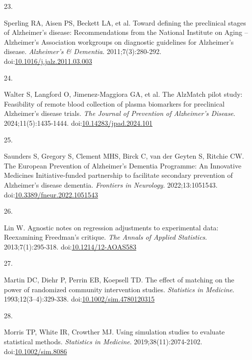 \documentclass[
  11pt,
]{article}
\newlength{\cslhangindent}
\newlength{\csllabelwidth}
\newenvironment{CSLReferences}[2] %
 {\begin{list}{}{%
  \setlength{\itemindent}{0pt}
  \setlength{\leftmargin}{0pt}
  \setlength{\parsep}{0pt}
  \ifodd #1
   \setlength{\leftmargin}{\cslhangindent}
   \setlength{\itemindent}{-1\cslhangindent}
  \fi
  \setlength{\itemsep}{#2\baselineskip}}}
 {\end{list}}
\newcommand{\CSLLeftMargin}[1]{\parbox[t]{\csllabelwidth}{\strut#1\strut}}
\newcommand{\CSLRightInline}[1]{\parbox[t]{\linewidth - \csllabelwidth}{\strut#1\strut}}
\begin{document}
\begin{CSLReferences}{0}{1}
\CSLLeftMargin{23. }%
\CSLRightInline{Sperling RA, Aisen PS, Beckett LA, et al. Toward defining the preclinical stages of {Alzheimer}'s disease: Recommendations from the {National Institute} on {Aging} -- {Alzheimer}'s {Association} workgroups on diagnostic guidelines for {Alzheimer}'s disease. \emph{Alzheimer's \& Dementia}. 2011;7(3):280-292. doi:\href{https://doi.org/10.1016/j.jalz.2011.03.003}{10.1016/j.jalz.2011.03.003}}

\CSLLeftMargin{24. }%
\CSLRightInline{{Walter S, Langford O, Jimenez-Maggiora GA, et al.} The {AlzMatch} pilot study: Feasibility of remote blood collection of plasma biomarkers for preclinical {Alzheimer}'s disease trials. \emph{The Journal of Prevention of Alzheimer's Disease}. 2024;11(5):1435-1444. doi:\href{https://doi.org/10.14283/jpad.2024.101}{10.14283/jpad.2024.101}}

\CSLLeftMargin{25. }%
\CSLRightInline{{Saunders S, Gregory S, Clement MHS, Birck C, van der Geyten S, Ritchie CW}. The {European Prevention} of {Alzheimer}'s {Dementia Programme}: {An Innovative Medicines Initiative-funded} partnership to facilitate secondary prevention of {Alzheimer}'s disease dementia. \emph{Frontiers in Neurology}. 2022;13:1051543. doi:\href{https://doi.org/10.3389/fneur.2022.1051543}{10.3389/fneur.2022.1051543}}

\CSLLeftMargin{26. }%
\CSLRightInline{Lin W. Agnostic notes on regression adjustments to experimental data: Reexamining {Freedman's} critique. \emph{The Annals of Applied Statistics}. 2013;7(1):295-318. doi:\href{https://doi.org/10.1214/12-AOAS583}{10.1214/12-AOAS583}}

\CSLLeftMargin{27. }%
\CSLRightInline{Martin DC, Diehr P, Perrin EB, Koepsell TD. The effect of matching on the power of randomized community intervention studies. \emph{Statistics in Medicine}. 1993;12(3--4):329-338. doi:\href{https://doi.org/10.1002/sim.4780120315}{10.1002/sim.4780120315}}

\CSLLeftMargin{28. }%
\CSLRightInline{Morris TP, White IR, Crowther MJ. Using simulation studies to evaluate statistical methods. \emph{Statistics in Medicine}. 2019;38(11):2074-2102. doi:\href{https://doi.org/10.1002/sim.8086}{10.1002/sim.8086}}

\end{CSLReferences}
\end{document}
